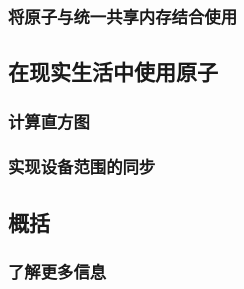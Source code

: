 \subsubsection{将原子与统一共享内存结合使用}

\subsection{在现实生活中使用原子}

\subsubsection{计算直方图}

\subsubsection{实现设备范围的同步}

\subsection{概括}

\subsubsection{了解更多信息}